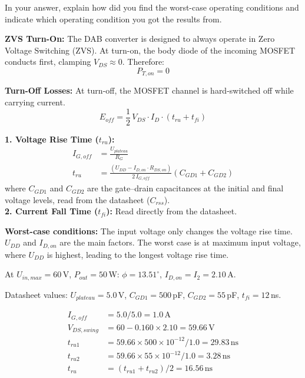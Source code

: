 \documentclass{PELsmallreport}
\begin{document}
In your answer, explain how did you find the worst-case operating conditions and indicate which operating condition you got the results from.
\begin{framed}
	\vspace{2em}
\textbf{ZVS Turn-On:} The DAB converter is designed to always operate in Zero Voltage Switching (ZVS). At turn-on, the body diode of the incoming MOSFET conducts first, clamping $V_{DS} \approx 0$. Therefore:
\begin{equation}
    P_{T,on} = 0
\end{equation}
 
\textbf{Turn-Off Losses:} At turn-off, the MOSFET channel is hard-switched off while carrying current.
\begin{equation}
    E_{off} = \frac{1}{2}\,V_{DS}\cdot I_D \cdot (t_{ru} + t_{fi})
\end{equation}
 
\textbf{1. Voltage Rise Time ($t_{ru}$):}
\begin{align}
    I_{G,off} &= \frac{U_{plateau}}{R_G} \\
    t_{ru} &= \frac{(U_{DD} - I_{D,on}\cdot R_{DS,on})}{2\,I_{G,off}}(C_{GD1} + C_{GD2})
\end{align}
where $C_{GD1}$ and $C_{GD2}$ are the gate--drain capacitances at the initial and final voltage levels, read from the datasheet ($C_{rss}$).
 \\
 
\textbf{2. Current Fall Time ($t_{fi}$):} Read directly from the datasheet.
 
\textbf{Worst-case conditions:} The input voltage only changes the voltage rise time. $U_{DD}$ and $I_{D,on}$ are the main factors. The worst case is at maximum input voltage, where $U_{DD}$ is highest, leading to the longest voltage rise time.
 
At $U_{in,max} = 60$\,V, $P_{out} = 50$\,W: $\phi = 13.51^\circ$, $I_{D,on} = I_2 = 2.10$\,A.
 
Datasheet values: $U_{plateau} = 5.0$\,V, $C_{GD1} = 500$\,pF, $C_{GD2} = 55$\,pF, $t_{fi} = 12$\,ns.
 
\begin{align}
    I_{G,off} &= 5.0 / 5.0 = 1.0\,\text{A} \\
    V_{DS,swing} &= 60 - 0.160 \times 2.10 = 59.66\,\text{V} \\
    t_{ru1} &= 59.66 \times 500\times10^{-12} / 1.0 = 29.83\,\text{ns} \\
    t_{ru2} &= 59.66 \times 55\times10^{-12} / 1.0 = 3.28\,\text{ns} \\
    t_{ru} &= (t_{ru1} + t_{ru2})/2 = 16.56\,\text{ns}
\end{align}
 

\end{framed}
\end{document}

